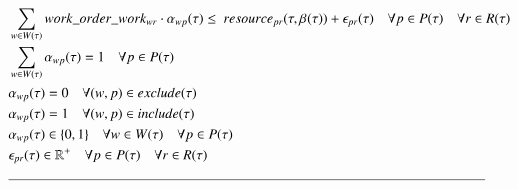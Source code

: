 \begin{alignat}{2}
	& \sum_{\ElementWorkOrder \in \SetWorkOrder{}} \ParStrategicWorkOrderWeight \cdot \VarStrategicWorkOrderAssignment{\ElementWorkOrder}{\ElementPeriod} \leq \ \ParStrategicResource + \VarStrategicExcess                                                                           \quad \forall \ElementPeriod \in \SetPeriod \quad \forall \ElementResource \in \SetResource                                \label{eqn:constraint:strategic:resource}\\
	& \sum_{\ElementWorkOrder \in \SetWorkOrder{}} \VarStrategicWorkOrderAssignment{\ElementWorkOrder}{\ElementPeriod} = 1              \quad \forall \ElementPeriod \in \SetPeriod                                                                                                                                                                                                                               \label{eqn:constraint:strategic:schedule_once}\\
	& \VarStrategicWorkOrderAssignment{\ElementWorkOrder}{\ElementPeriod} = 0                                                            \quad \forall (\ElementWorkOrder, \ElementPeriod) \in \ParStrategicExclude                                                                                                                                                                                               \label{eqn:constraint:strategic:include}\\
	& \VarStrategicWorkOrderAssignment{\ElementWorkOrder}{\ElementPeriod} = 1                                                            \quad \forall (\ElementWorkOrder, \ElementPeriod) \in \ParStrategicInclude                                                                                                                                                                                               \label{eqn:constraint:strategic:exclude}\\
	& \VarStrategicWorkOrderAssignment{\ElementWorkOrder}{\ElementPeriod} \in \{0, 1\}                                                   \quad \forall \ElementWorkOrder \in \SetWorkOrder{} \quad \forall \ElementPeriod \in \SetPeriod                                                                                                                                                                           \label{eqn:variable:strategic:assignment}      \\ 
	& \VarStrategicExcess \in \mathbb{R}^{+}                                                                                             \quad \forall \ElementPeriod \in \SetPeriod \quad \forall \ElementResource \in \SetResource                                                                                                                                                                               \label{eqn:variable:strateigc:penalty}\\ 
	& \text{\rule{\linewidth}{0.4pt}} \notag
\end{alignat}
\newpage

